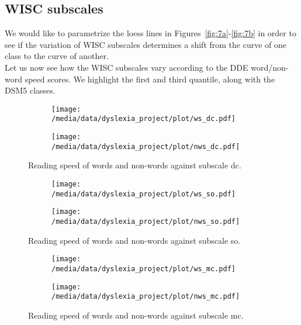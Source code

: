 \documentclass[11pt, a4paper, twoside, openright]{article}
\begin{document}
\clearpage

\subsection{WISC subscales}
We would like to parametrize the loess lines in
Figures~\ref{fig:7a}-\ref{fig:7b} in order to see if the variation of
WISC subscales determines a shift from the curve of one class to the
curve of another.\\
Let us now see how the WISC subscales vary according to the DDE
word/non-word speed scores. We highlight the first and third quantile,
along with the DSM5 classes.

\begin{figure}[h!] 
\centering 
\begin{subfigure}{1\textwidth}
\centering
\texttt{[image: /media/data/dyslexia\_project/plot/ws\_dc.pdf]}
\caption{}
\label{fig:8a}
\end{subfigure}
\end{figure}
\begin{figure}
\ContinuedFloat
\centering 
\begin{subfigure}{1\textwidth}
\centering
\texttt{[image: /media/data/dyslexia\_project/plot/nws\_dc.pdf]}
\caption{}
\label{fig:8b}
\end{subfigure}
\caption{Reading speed of words and non-words against subscale dc.}
\label{fig:8}
\end{figure}

\begin{figure}[h!] 
\centering 
\begin{subfigure}{1\textwidth}
\centering
\texttt{[image: /media/data/dyslexia\_project/plot/ws\_so.pdf]}
\caption{}
\label{fig:9a}
\end{subfigure}
\end{figure}
\begin{figure}
\ContinuedFloat
\centering 
\begin{subfigure}{1\textwidth}
\centering
\texttt{[image: /media/data/dyslexia\_project/plot/nws\_so.pdf]}
\caption{}
\label{fig:9b}
\end{subfigure}
\caption{Reading speed of words and non-words against subscale so.}
\label{fig:9}
\end{figure}

\begin{figure}[h!] 
\centering 
\begin{subfigure}{1\textwidth}
\centering
\texttt{[image: /media/data/dyslexia\_project/plot/ws\_mc.pdf]}
\caption{}
\label{fig:10a}
\end{subfigure}
\end{figure}
\begin{figure}
\ContinuedFloat
\centering 
\begin{subfigure}{1\textwidth}
\centering
\texttt{[image: /media/data/dyslexia\_project/plot/nws\_mc.pdf]}
\caption{}
\label{fig:10b}
\end{subfigure}
\caption{Reading speed of words and non-words against subscale mc.}
\label{fig:10}
\end{figure}
\end{document}
